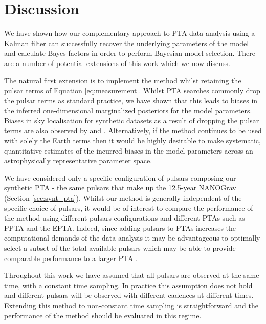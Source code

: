 \documentclass[fleqn,usenatbib,useAMS]{mnras}
\begin{document}
\section{Discussion}\label{sec:discussion}
We have shown how our complementary approach to PTA data analysis using a Kalman filter can successfully recover the underlying parameters of the model and calculate Bayes factors in order to perform Bayesian model selection. There are a number of potential extensions of this work which we now discuss.  \newline 

The natural first extension is to implement the method whilst retaining the pulsar terms of Equation \ref{eq:measurement}. Whilst PTA searches commonly drop the pulsar terms as standard practice, we have shown that this leads to biases in the inferred one-dimensional marginalized posteriors for the model parameters. Biases in sky localisation for synthetic datasets as a result of dropping the pulsar terms are also observed by \cite{Zhupulsarterms} and \cite{Chen2022}. Alternatively, if the method continues to be used with solely the Earth terms then it would be highly desirable to make systematic, quantitative estimates of the incurred biases in the model parameters across an astrophysically representative parameter space. \newline 

We have considered only a specific configuration of pulsars composing our synthetic PTA - the same pulsars that make up the 12.5-year NANOGrav (Section \ref{sec:synt_pta}). Whilst our method is generally independent of the specific choice of pulsars, it would be of interest to compare the performance of the method using different pulsars configurations and different PTAs such as PPTA and the EPTA. Indeed, since adding pulsars to PTAs increases the computational demands of the data analysis it may be advantageous to optimally select a subset of the total available pulsars which may be able to provide comparable performance to a larger PTA  \citep{2023MNRAS.518.1802S}.  \newline 

Throughout this work we have assumed that all pulsars are observed at the same time, with a constant time sampling. In practice this assumption does not hold and different pulsars will be observed with different cadences at different times. Extending this method to non-constant time sampling is straightforward and the performance of the method should be evaluated in this regime. \newline 
\end{document}
